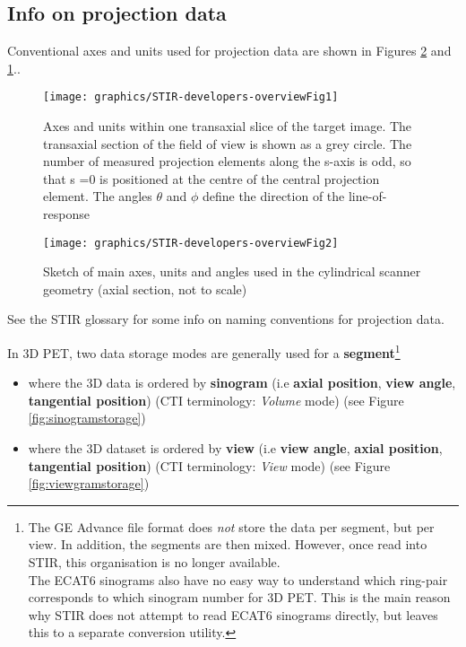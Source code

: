 \documentclass{article}
\begin{document}
\subsection{
Info on projection data}

Conventional axes and units used for projection data are shown 
in Figures \ref{scanner-image-units} and \ref{image-units}..

\begin{figure}[htbp]
\begin{center}
\texttt{[image: graphics/STIR-developers-overviewFig1]}
\caption{ Axes and units within one transaxial 
slice of the target image. The transaxial section of the field 
of view is shown as a grey circle. The number of measured projection 
elements along the s-axis is odd, so that s =0 is positioned 
at the centre of the central projection element. The angles \ensuremath{\theta} 
and \ensuremath{\phi} define the direction of the line-of-response }
\label{image-units}
\end{center}
\end{figure}

\begin{figure}[htbp]
\begin{center}
\texttt{[image: graphics/STIR-developers-overviewFig2]}
\caption{Sketch of main axes, units and angles used in the cylindrical 
scanner geometry (axial section, not to scale)}
\label{scanner-image-units}
\end{center}
\end{figure}


See the STIR glossary for some info on naming conventions for 
projection data.


In 3D PET, two data storage modes are generally used for a \textbf{segment}\footnote{{The 
GE Advance file format does \textit{not} store the data per segment, 
but per view. In addition, the segments are then mixed. However, 
once read into STIR, this organisation is no longer available. 
\\
The ECAT6 sinograms also have no easy way to understand which 
ring-pair corresponds to which sinogram number for 3D PET. This 
is the main reason why STIR does not attempt to read ECAT6 sinograms 
directly, but leaves this to a separate conversion utility.}}
\begin{itemize}
\item 
where the 3D data is ordered by \textbf{sinogram} (i.e \textbf{axial position}, \textbf{view 
angle}, \textbf{tangential position}) (CTI terminology: \textit{Volume} mode) 
(see Figure \ref{fig:sinogramstorage})
\item where the 3D dataset is ordered by \textbf{view} (i.e \textbf{view angle}, \textbf{axial 
position}, \textbf{tangential position}) (CTI terminology: \textit{View}  
mode) (see Figure \ref{fig:viewgramstorage})
\end{itemize}
\end{document}
